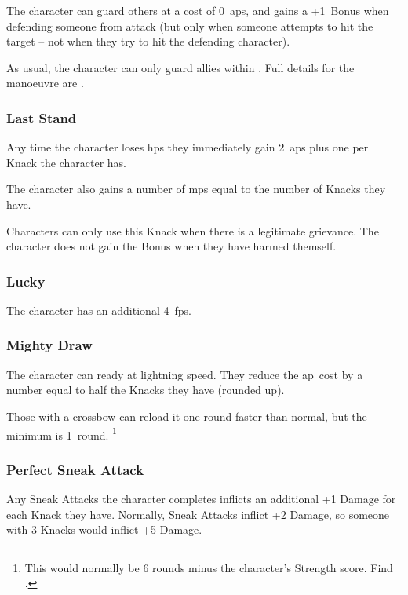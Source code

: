 \begin{multicols}{2}
The character can guard others at a cost of 0~\glspl{ap}, and gains a +1~Bonus when defending someone from attack (but only when someone attempts to hit the target -- not when they try to hit the defending character).

As usual, the character can only guard allies within .
Full details for the manoeuvre are .

\subsubsection{Last Stand}

Any time the character loses \glspl{hp} they immediately gain 2~\glspl{ap} plus one per Knack the character has.

The character also gains a number of \glspl{mp} equal to the number of Knacks they have.

Characters can only use this Knack when there is a legitimate grievance.
The character does not gain the Bonus when they have harmed themself.

\subsubsection{Lucky}

The character has an additional 4~\glspl{fp}.

\subsubsection{Mighty Draw}

The character can ready  at lightning speed.
They reduce the \gls{ap}~cost by a number equal to half the Knacks they have (rounded up).

Those with a crossbow can reload it one round faster than normal, but the minimum is 1~round.%
\footnote{This would normally be 6 rounds minus the character's Strength score.
Find  .}

\subsubsection{Perfect Sneak Attack}

Any Sneak Attacks the character completes inflicts an additional +1 Damage for each Knack they have.
Normally, Sneak Attacks inflict +2 Damage, so someone with 3 Knacks would inflict +5 Damage.


\end{multicols}
